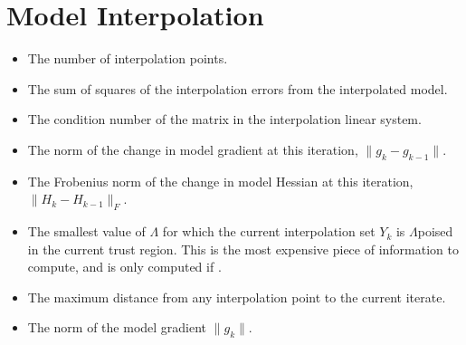 \documentclass[letterpaper,10pt,english]{sphinxmanual}
\begin{document}
\section{Model Interpolation}
\label{\detokenize{diagnostic:model-interpolation}}\begin{itemize}
\item {} 
 \sphinxhyphen{} The number of interpolation points.

\item {} 
 \sphinxhyphen{} The sum of squares of the interpolation errors from the interpolated model.

\item {} 
 \sphinxhyphen{} The condition number of the matrix in the interpolation linear system.

\item {} 
 \sphinxhyphen{} The norm of the change in model gradient at this iteration, \(\|g_k-g_{k-1}\|\).

\item {} 
 \sphinxhyphen{} The Frobenius norm of the change in model Hessian at this iteration, \(\|H_k-H_{k-1}\|_F\).

\item {} 
 \sphinxhyphen{} The smallest value of \(\Lambda\) for which the current interpolation set \(Y_k\) is \(\Lambda\)\sphinxhyphen{}poised in the current trust region. This is the most expensive piece of information to compute, and is only computed if \sphinxcode{\sphinxupquote{user\_params{[}\textquotesingle{}logging.save\_poisedness\textquotesingle{} = True}}.

\item {} 
 \sphinxhyphen{} The maximum distance from any interpolation point to the current iterate.

\item {} 
 \sphinxhyphen{} The norm of the model gradient \(\|g_k\|\).

\end{itemize}
\end{document}
